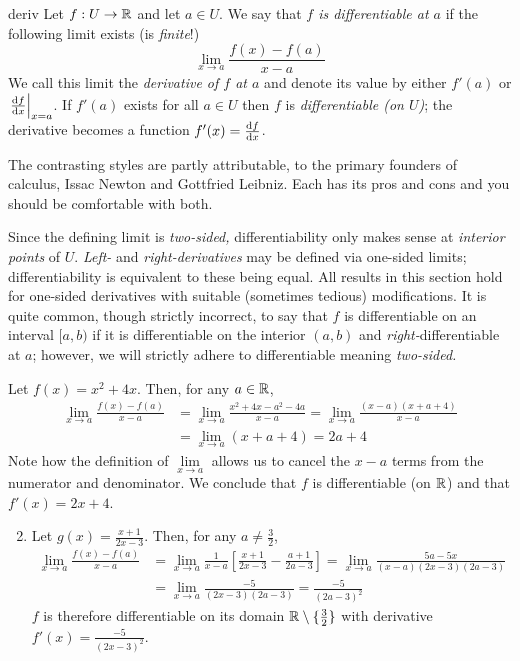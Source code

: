 \begin{defn}{}{deriv}
Let $f:U\to\R$ and let $a\in U$. We say that \emph{$f$ is differentiable at $a$} if the following limit exists (is \emph{finite}!)
\[\lim_{x\to a}\frac{f(x)-f(a)}{x-a}\]
We call this limit the \emph{derivative of $f$ at $a$} and denote its value by either $f'(a)$ or $\diffat[f]{x}{x=a}$.\smallbreak
If $f'(a)$ exists for all $a\in U$ then $f$ is \emph{differentiable (on $U$)}; the derivative becomes a function $f'(x)=\diff[f]{x}$.
\end{defn}

 The contrasting styles are partly attributable,  to the primary founders of calculus, Issac Newton and Gottfried Leibniz. Each has its pros and cons and you should be comfortable with both.

 Since the defining limit is \emph{two-sided,} differentiability only makes sense at \emph{interior points} of $U$. \emph{Left-} and \emph{right-derivatives} may be defined via one-sided limits; differentiability is  equivalent to these being equal. All results in this section hold for one-sided derivatives with suitable (sometimes tedious) modifications. It is quite common, though strictly incorrect, to say that $f$ is differentiable on an interval $[a,b)$ if it is differentiable on the interior $(a,b)$ and \emph{right-}differentiable at $a$; however, we will strictly adhere to differentiable meaning \emph{two-sided.}


\begin{examples}{}{}
\exstart Let $f(x)=x^2+4x$. Then, for any $a\in\R$,
	\begin{align*}
		\lim_{x\to a}\frac{f(x)-f(a)}{x-a}&= \lim_{x\to a}\frac{x^2+4x-a^2-4a}{x-a} =\lim_{x\to a}\frac{(x-a)(x+a+4)}{x-a}\\
		&=\lim_{x\to a}(x+a+4)=2a+4
	\end{align*}
	Note how the definition of $\lim\limits_{x\to a}$ allows us to cancel the $x-a$ terms from the numerator and denominator. We conclude that $f$ is differentiable (on $\R$) and that $f'(x)=2x+4$.
\begin{enumerate}\setcounter{enumi}{1}
	\item Let $g(x)=\frac{x+1}{2x-3}$. Then, for any $a\neq\frac 32$,
	\begin{align*}
		\lim_{x\to a}\frac{f(x)-f(a)}{x-a}&= \lim_{x\to a}\frac 1{x-a}\left[\frac{x+1}{2x-3}-\frac{a+1}{2a-3}\right] =\lim_{x\to a}\frac{5a-5x}{(x-a)(2x-3)(2a-3)}\\
		&=\lim_{x\to a}\frac{-5}{(2x-3)(2a-3)} =\frac{-5}{(2a-3)^2}
	\end{align*}
	$f$ is therefore differentiable on its domain $\R\setminus\{\frac 32\}$ with derivative $f'(x)=\frac{-5}{(2x-3)^2}$.
\end{enumerate}
\end{examples}

